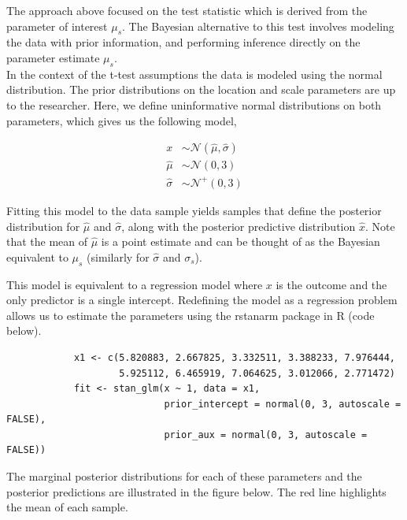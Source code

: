\documentclass[12pt]{article}
\begin{document}
The approach above focused on the test statistic which is derived from the parameter of interest $\mu_s$. The Bayesian alternative to this test involves modeling the data with prior information, and performing inference directly on the parameter estimate $\mu_s$. \\

\noindent In the context of the t-test assumptions the data is modeled using the normal distribution. The prior distributions on the location and scale parameters are up to the researcher. Here, we define uninformative normal distributions on both parameters, which gives us the following model,

\begin{align*}
x &\sim \mathcal{N}(\hat{\mu}, \hat{\sigma}) \\
\hat{\mu} &\sim \mathcal{N}(0,3) \\
\hat{\sigma} &\sim \mathcal{N}^{+}(0,3)
\end{align*}

\noindent Fitting this model to the data sample yields samples that define the posterior distribution for $\hat{\mu}$ and $\hat{\sigma}$, along with the posterior predictive distribution $\hat{x}$. Note that the mean of $\hat{\mu}$ is a point estimate and can be thought of as the Bayesian equivalent to $\mu_s$ (similarly for $\hat{\sigma}$ and $\sigma_s$).

\noindent This model is equivalent to a regression model where $x$ is the outcome and the only predictor is a single intercept. Redefining the model as a regression problem allows us to estimate the parameters using the rstanarm package in R (code below). \\

\begin{verbatim}
            x1 <- c(5.820883, 2.667825, 3.332511, 3.388233, 7.976444,
                    5.925112, 6.465919, 7.064625, 3.012066, 2.771472)
            fit <- stan_glm(x ~ 1, data = x1,
                            prior_intercept = normal(0, 3, autoscale = FALSE),
                            prior_aux = normal(0, 3, autoscale = FALSE))
\end{verbatim}

\noindent The marginal posterior distributions for each of these parameters and the posterior predictions are illustrated in the figure below. The red line highlights the mean of each sample. \\
\end{document}
